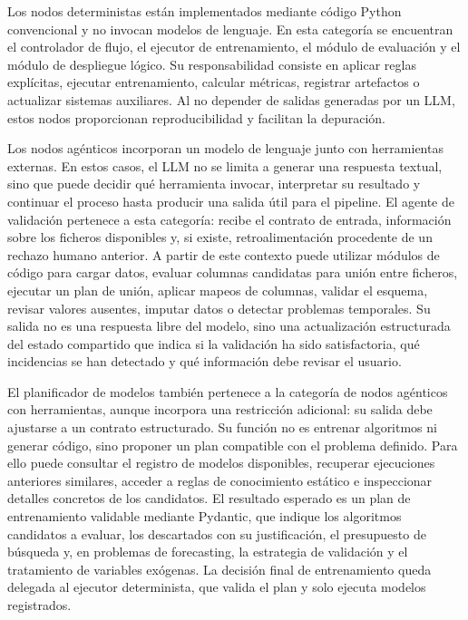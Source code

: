 \documentclass[12pt,a4paper]{article}
\theoremstyle{plain}
\begin{document}
Los nodos deterministas están implementados mediante código Python convencional y no invocan modelos de lenguaje. En esta categoría se encuentran el controlador de flujo, el ejecutor de entrenamiento, el módulo de evaluación y el módulo de despliegue lógico. Su responsabilidad consiste en aplicar reglas explícitas, ejecutar entrenamiento, calcular métricas, registrar artefactos o actualizar sistemas auxiliares. Al no depender de salidas generadas por un LLM, estos nodos proporcionan reproducibilidad y facilitan la depuración.

Los nodos agénticos incorporan un modelo de lenguaje junto con herramientas externas. En estos casos, el LLM no se limita a generar una respuesta textual, sino que puede decidir qué herramienta invocar, interpretar su resultado y continuar el proceso hasta producir una salida útil para el pipeline. El agente de validación pertenece a esta categoría: recibe el contrato de entrada, información sobre los ficheros disponibles y, si existe, retroalimentación procedente de un rechazo humano anterior. A partir de este contexto puede utilizar módulos de código para cargar datos, evaluar columnas candidatas para unión entre ficheros, ejecutar un plan de unión, aplicar mapeos de columnas, validar el esquema, revisar valores ausentes, imputar datos o detectar problemas temporales. Su salida no es una respuesta libre del modelo, sino una actualización estructurada del estado compartido que indica si la validación ha sido satisfactoria, qué incidencias se han detectado y qué información debe revisar el usuario.

El planificador de modelos también pertenece a la categoría de nodos agénticos con herramientas, aunque incorpora una restricción adicional: su salida debe ajustarse a un contrato estructurado. Su función no es entrenar algoritmos ni generar código, sino proponer un plan compatible con el problema definido. Para ello puede consultar el registro de modelos disponibles, recuperar ejecuciones anteriores similares, acceder a reglas de conocimiento estático e inspeccionar detalles concretos de los candidatos. El resultado esperado es un plan de entrenamiento validable mediante Pydantic, que indique los algoritmos candidatos a evaluar, los descartados con su justificación, el presupuesto de búsqueda y, en problemas de forecasting, la estrategia de validación y el tratamiento de variables exógenas. La decisión final de entrenamiento queda delegada al ejecutor determinista, que valida el plan y solo ejecuta modelos registrados.
\end{document}
